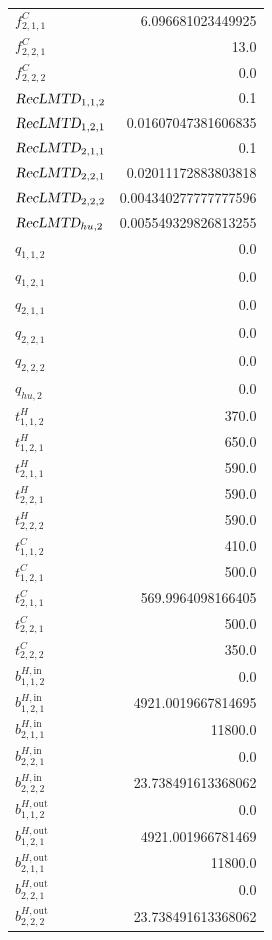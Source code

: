\documentclass{article}%
\begin{document}
\begin{multicols*}{3}
\begin{supertabular}{lr}
	$f_{2,1,1}^{C}$ & 6.096681023449925 \\%
	$f_{2,2,1}^{C}$ & 13.0 \\%
	$f_{2,2,2}^{C}$ & 0.0 \\%
	$\textsl{RecLMTD}_{1,1,2}$ & 0.1 \\%
	$\textsl{RecLMTD}_{1,2,1}$ & 0.01607047381606835 \\%
	$\textsl{RecLMTD}_{2,1,1}$ & 0.1 \\%
	$\textsl{RecLMTD}_{2,2,1}$ & 0.02011172883803818 \\%
	$\textsl{RecLMTD}_{2,2,2}$ & 0.004340277777777596 \\%
	$\textsl{RecLMTD}_{hu,2}$ & 0.005549329826813255 \\%
	$q_{1,1,2}$ & 0.0 \\%
	$q_{1,2,1}$ & 0.0 \\%
	$q_{2,1,1}$ & 0.0 \\%
	$q_{2,2,1}$ & 0.0 \\%
	$q_{2,2,2}$ & 0.0 \\%
	$q_{hu,2}$ & 0.0 \\%
	$t_{1,1,2}^{H}$ & 370.0 \\%
	$t_{1,2,1}^{H}$ & 650.0 \\%
	$t_{2,1,1}^{H}$ & 590.0 \\%
	$t_{2,2,1}^{H}$ & 590.0 \\%
	$t_{2,2,2}^{H}$ & 590.0 \\%
	$t_{1,1,2}^{C}$ & 410.0 \\%
	$t_{1,2,1}^{C}$ & 500.0 \\%
	$t_{2,1,1}^{C}$ & 569.9964098166405 \\%
	$t_{2,2,1}^{C}$ & 500.0 \\%
	$t_{2,2,2}^{C}$ & 350.0 \\%
	$b_{1,1,2}^{H,\text{in}}$ & 0.0 \\%
	$b_{1,2,1}^{H,\text{in}}$ & 4921.0019667814695 \\%
	$b_{2,1,1}^{H,\text{in}}$ & 11800.0 \\%
	$b_{2,2,1}^{H,\text{in}}$ & 0.0 \\%
	$b_{2,2,2}^{H,\text{in}}$ & 23.738491613368062 \\%
	$b_{1,1,2}^{H,\text{out}}$ & 0.0 \\%
	$b_{1,2,1}^{H,\text{out}}$ & 4921.001966781469 \\%
	$b_{2,1,1}^{H,\text{out}}$ & 11800.0 \\%
	$b_{2,2,1}^{H,\text{out}}$ & 0.0 \\%
	$b_{2,2,2}^{H,\text{out}}$ & 23.738491613368062 \\%

\end{supertabular}
\end{multicols*}
\end{document}
